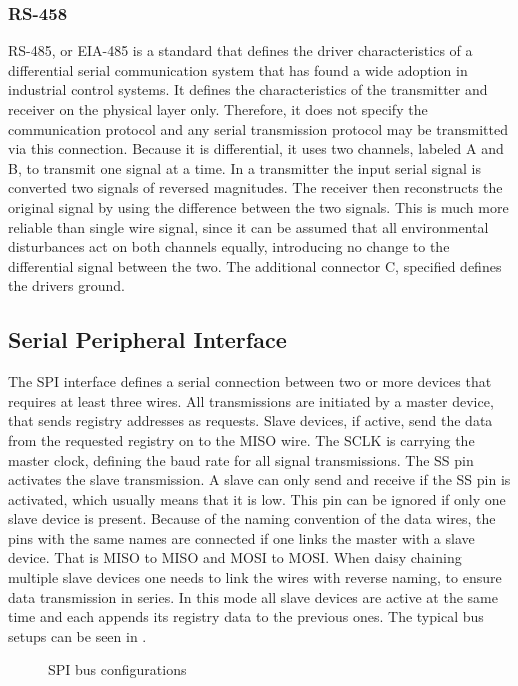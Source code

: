 \subsubsection{RS-458}
\acs{RS}-485, or EIA-485 is a standard that defines the driver characteristics of a differential serial communication system that has found a wide adoption in industrial control systems. It defines the characteristics of the transmitter and receiver on the physical layer only. Therefore, it does not specify the communication protocol and any serial transmission protocol may be transmitted via this connection. Because it is differential, it uses two channels, labeled A and B, to transmit one signal at a time. In a transmitter the input serial signal is converted two signals of reversed magnitudes. The receiver then reconstructs the original signal by using the difference between the two signals. This is much more reliable than single wire signal, since it can be assumed that all environmental disturbances act on both channels equally, introducing no change to the differential signal between the two. The additional connector C, specified defines the drivers ground.

\subsection{Serial Peripheral Interface}
The \ac{SPI} interface defines a serial connection between two or more devices that requires at least three wires. All transmissions are initiated by a master device, that sends registry addresses as requests. Slave devices, if active, send the data from the requested registry on to the \ac{MISO} wire. The \ac{SCLK} is carrying the master clock, defining the baud rate for all signal transmissions. The \ac{SS} pin activates the slave transmission. A slave can only send and receive if the \ac{SS} pin is activated, which usually means that it is low. This pin can be ignored if only one slave device is present. Because of the naming convention of the data wires, the pins with the same names are connected if one links the master with a slave device. That is \ac{MISO} to \ac{MISO} and \ac{MOSI} to \ac{MOSI}. When daisy chaining multiple slave devices one needs to link the wires with reverse naming, to ensure data transmission in series. In this mode all slave devices are active at the same time and each appends its registry data to the previous ones. The typical bus setups can be seen in .

\begin{figure}[!htb]
  \centering
  \hfill
  \caption[SPI Bus Configurations]{\ac{SPI} bus configurations%
    \label{fig:spi_bus}}
\end{figure}

